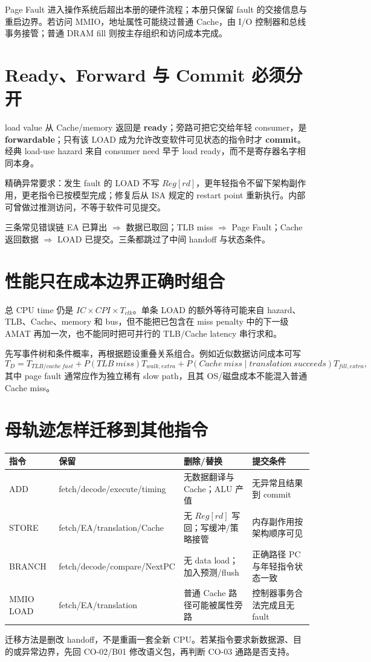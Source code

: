 \documentclass[UTF8,fontset=fandol,11pt,a4paper]{ctexart}
\newcommand{\kw}[1]{\textbf{\color{deep}#1}}
\begin{document}
Page Fault 进入操作系统后超出本册的硬件流程；本册只保留 fault 的交接信息与重启边界。若访问 MMIO，地址属性可能绕过普通 Cache，由 I/O 控制器和总线事务接管；普通 DRAM fill 则按主存组织和访问成本完成。

\section{Ready、Forward 与 Commit 必须分开}
load value 从 Cache/memory 返回是 \kw{ready}；旁路可把它交给年轻 consumer，是 \kw{forwardable}；只有该 LOAD 成为允许改变软件可见状态的指令时才 \kw{commit}。经典 load-use hazard 来自 consumer need 早于 load ready，而不是寄存器名字相同本身。

精确异常要求：发生 fault 的 LOAD 不写 $Reg[rd]$，更年轻指令不留下架构副作用，更老指令已按模型完成；修复后从 ISA 规定的 restart point 重新执行。内部可曾做过推测访问，不等于软件可见提交。

\begin{warnbox}{三条常见错误链}
EA 已算出 $\Rightarrow$ 数据已取回；TLB miss $\Rightarrow$ Page Fault；Cache 返回数据 $\Rightarrow$ LOAD 已提交。三条都跳过了中间 handoff 与状态条件。
\end{warnbox}

\section{性能只在成本边界正确时组合}
总 CPU time 仍是 $IC\times CPI\times T_{clk}$。单条 LOAD 的额外等待可能来自 hazard、TLB、Cache、memory 和 bus，但不能把已包含在 miss penalty 中的下一级 AMAT 再加一次，也不能同时把可并行的 TLB/Cache latency 串行求和。

先写事件树和条件概率，再根据题设重叠关系组合。例如近似数据访问成本可写
\[
T_D=T_{TLB/cache\ fast}+P(TLB\ miss)T_{walk,extra}
+P(Cache\ miss\mid translation\ succeeds)T_{fill,extra},
\]
其中 page fault 通常应作为独立稀有 slow path，且其 OS/磁盘成本不能混入普通 Cache miss。

\section{母轨迹怎样迁移到其他指令}
\begin{center}\small
\begin{tabularx}{\linewidth}{L{1.6cm}YYY}\toprule
指令 & 保留 & 删除/替换 & 提交条件\\\midrule
ADD & fetch/decode/execute/timing & 无数据翻译与 Cache；ALU 产值 & 无异常且结果到 commit\\
STORE & fetch/EA/translation/Cache & 无 $Reg[rd]$ 写回；写缓冲/策略接管 & 内存副作用按架构顺序可见\\
BRANCH & fetch/decode/compare/NextPC & 无 data load；加入预测/flush & 正确路径 PC 与年轻指令状态一致\\
MMIO LOAD & fetch/EA/translation & 普通 Cache 路径可能被属性旁路 & 控制器事务合法完成且无 fault\\
\bottomrule
\end{tabularx}
\end{center}
迁移方法是删改 handoff，不是重画一套全新 CPU。若某指令要求新数据源、目的或异常边界，先回 CO-02/B01 修改语义包，再判断 CO-03 通路是否支持。
\end{document}
